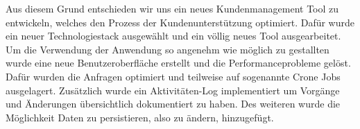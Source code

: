 Aus diesem Grund entschieden wir uns ein neues Kundenmanagement Tool zu entwickeln, welches den Prozess der Kundenunterstützung optimiert. Dafür wurde ein neuer Technologiestack ausgewählt und ein völlig neues Tool ausgearbeitet. Um die Verwendung der Anwendung so angenehm wie möglich zu gestallten wurde eine neue Benutzeroberfläche erstellt und die Performanceprobleme gelöst. Dafür wurden die Anfragen optimiert und teilweise auf sogenannte Crone Jobs ausgelagert.
\newline
Zusätzlich wurde ein Aktivitäten-Log implementiert um Vorgänge und Änderungen übersichtlich dokumentiert zu haben. Des weiteren wurde die Möglichkeit Daten zu persistieren, also zu ändern, hinzugefügt.